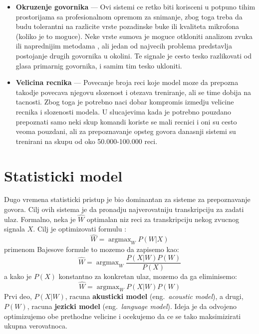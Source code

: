 \documentclass[a4paper]{article}
\DeclareMathOperator*{\argmax}{argmax}
\begin{document}
\begin{itemize}
  \item \textbf{Okruzenje govornika} --- 
  Ovi sistemi ce retko biti korisceni u potpuno tihim prostorijama sa profesionalnom opremom za snimanje, zbog toga treba da budu tolerantni na razlicite vrste pozadinske buke ili kvaliteta mikrofona (koliko je to moguce). 
  Neke vrste sumova je moguce otkloniti analizom zvuka ili naprednijim metodama \cite{xu2015enhancement}, ali jedan od najvecih problema predstavlja postojanje drugih govornika u okolini.
  Te signale je cesto tesko razlikovati od glasa primarnig govornika, i samim tim tesko ukloniti.
  
  \item \textbf{Velicina recnika} --- 
  Povecanje broja reci koje model moze da prepozna takodje povecava njegovu slozenost i otezava treniranje, ali se time dobija na tacnosti. 
  Zbog toga je potrebno naci dobar kompromis izmedju velicine recnika i slozenosti modela. 
  U slucajevima kada je potrebno pouzdano prepoznati samo neki skup komandi koriste se mali recnici i oni su cesto veoma pouzdani, ali za prepoznavanje opsteg govora danasnji sistemi su trenirani na skupu od oko 50.000-100.000 reci.
\end{itemize}

\section{Statisticki model}
Dugo vremena statisticki pristup je bio dominantan za sisteme za prepoznavanje govora.
Cilj ovih sistema je da pronadju najverovatniju transkripciju za zadati ulaz.
Formalno, neka je $\hat{W}$ optimalan niz reci za transkripciju nekog zvucnog signala $X$. Cilj je optimizovati formulu \cite{kamath2019nlp}:
\begin{equation*}
  \hat{W} = \argmax_{W} P(W|X)
\end{equation*}
primenom Bajesove formule to mozemo da zapisemo kao:
\begin{equation*}
  \hat{W} = \argmax_{W} \frac{P(X|W) P(W)}{P(X)}
\end{equation*}
a kako je $P(X)$ konstantno za konkretan ulaz, mozemo da ga eliminisemo:
\begin{equation}
  \label{eq:stat1}
  \hat{W} = \argmax_{W} P(X|W) P(W)
\end{equation}
Prvi deo, $P(X|W)$, racuna \textbf{akusticki model} (eng.~{\em acoustic model}), a drugi, $P(W)$, racuna \textbf{jezicki model} (eng.~{\em language model}).
Ideja je da odvojeno optimizujemo obe prethodne velicine i ocekujemo da ce se tako maksimizirati ukupna verovatnoca.
\end{document}
